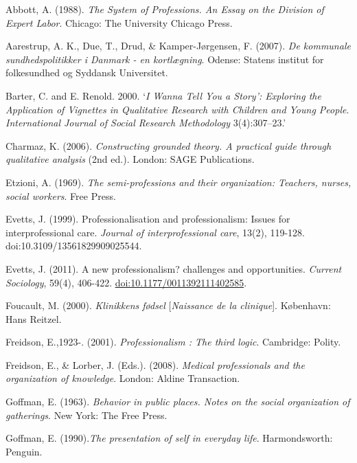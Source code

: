 \label{paper3:references}
\begin{thebibliography}{99}

\item Abbott, A. (1988). \textit{The System of Professions. An Essay on the Division of Expert Labor}. Chicago: The University Chicago Press. 
\item Aarestrup, A. K., Due, T., Drud, \& Kamper-Jørgensen, F. (2007). \textit{De kommunale sundhedspolitikker i Danmark - en kortlægning}. Odense: Statens institut for folkesundhed og Syddansk Universitet. 
\item Barter, C. and E. Renold. 2000. ‘\textit{I Wanna Tell You a Story’: Exploring the Application of Vignettes in Qualitative Research with Children and Young People}. \textit{International Journal of Social Research Methodology }3(4):307–23.'
\item Charmaz, K. (2006). \textit{Constructing grounded theory. A practical guide through qualitative analysis} (2nd ed.). London: SAGE Publications. 
\item Etzioni, A. (1969). \textit{The semi-professions and their organization: Teachers, nurses, social workers}. Free Press.
\item Evetts, J. (1999). Professionalisation and professionalism: Issues for interprofessional care. \textit{Journal of interprofessional care}, 13(2), 119-128. doi:10.3109/13561829909025544.
\item Evetts, J. (2011). A new professionalism? challenges and opportunities. \textit{Current Sociology}, 59(4), 406-422. \url{doi:10.1177/0011392111402585}.
\item Foucault, M. (2000). \textit{Klinikkens fødsel} [\textit{Naissance de la clinique}]. København: Hans Reitzel.
\item Freidson, E.,1923-. (2001). \textit{Professionalism : The third logic}. Cambridge: Polity.
\item Freidson, E., \& Lorber, J. (Eds.). (2008). \textit{Medical professionals and the organization of knowledge}. London: Aldine Transaction. 
\item Goffman, E. (1963). \textit{Behavior in public places. Notes on the social organization of gatherings}. New York: The Free Press. 
\item Goffman, E. (1990).\textit{The presentation of self in everyday life}. Harmondsworth: Penguin.

\end{thebibliography}
